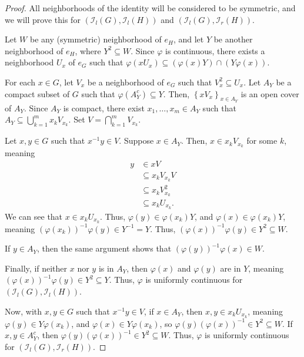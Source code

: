 \documentclass[10pt]{extarticle}
\newcommand{\set}[1]{\left\{#1\right\}}
\theoremstyle{plain}
\theoremstyle{definition}
\theoremstyle{note}
\renewcommand{\newline}{\hfill\break}
\begin{document}
\begin{proof}
  All neighborhoods of the identity will be considered to be symmetric, and we will prove this for $\left(\mathcal{I}_l(G),\mathcal{I}_l(H)\right)$ and $\left(\mathcal{I}_l(G),\mathcal{I}_r(H)\right)$.\newline

  Let $W$ be any (symmetric) neighborhood of $e_H$, and let $Y$ be another neighborhood of $e_H$, where $Y^2\subseteq W$. Since $\varphi$ is continuous, there exists a neighborhood $U_x$ of $e_G$ such that $\varphi\left(xU_x\right) \subseteq \left(\varphi(x)Y\right)\cap \left(Y\varphi(x)\right)$.\newline

  For each $x\in G$, let $V_x$ be a neighborhood of $e_G$ such that $V_x^2 \subseteq U_x$. Let $A_Y$ be a compact subset of $G$ such that $\varphi\left(A_Y^{c}\right)\subseteq Y$. Then, $\set{xV_x}_{x\in A_Y}$ is an open cover of $A_Y$. Since $A_Y$ is compact, there exist $x_1,\dots,x_m\in A_Y$ such that $A_Y\subseteq \bigcup_{k=1}^{m}x_kV_{x_k}$. Set $V = \bigcap_{k=1}^{m}V_{x_k}$.\newline

  Let $x,y\in G$ such that $x^{-1}y\in V$. Suppose $x\in A_Y$. Then, $x\in x_kV_{x_k}$ for some $k$, meaning
  \begin{align*}
    y&\in xV\\
     &\subseteq x_kV_{x_k}V\\
     &\subseteq x_kV_{x_k}^2\\
     &\subseteq x_kU_{x_k}.
  \end{align*}
  We can see that $x\in x_kU_{x_k}$. Thus, $\varphi\left(y\right)\in \varphi\left(x_k\right)Y$, and $\varphi(x) \in \varphi\left(x_k\right)Y$, meaning $\left(\varphi\left(x_k\right)\right)^{-1}\varphi(y)\in Y^{-1} = Y$. Thus, $\left(\varphi(x)\right)^{-1}\varphi(y) \in Y^2\subseteq W$.\newline

  If $y\in A_Y$, then the same argument shows that $\left(\varphi(y)\right)^{-1}\varphi(x)\in W$.\newline

  Finally, if neither $x$ nor $y$ is in $A_Y$, then $\varphi(x)$ and $\varphi(y)$ are in $Y$, meaning $\left(\varphi(x)\right)^{-1}\varphi(y)\in Y^{2}\subseteq Y$. Thus, $\varphi$ is uniformly continuous for $\left(\mathcal{I}_l(G),\mathcal{I}_l(H)\right)$.\newline

  Now, with $x,y\in G$ such that $x^{-1}y\in V$, if $x\in A_Y$, then $x,y\in x_kU_{x_k}$, meaning $\varphi(y)\in Y\varphi\left(x_{k}\right)$, and $\varphi(x)\in Y\varphi\left(x_k\right)$, so $\varphi(y)\left(\varphi\left(x\right)\right)^{-1} \in Y^{2}\subseteq W$. If $x,y\in A_Y^{c}$, then $\varphi(y)\left(\varphi(x)\right)^{-1}\in Y^{2}\subseteq W$. Thus, $\varphi$ is uniformly continuous for $\left(\mathcal{I}_l(G),\mathcal{I}_r(H)\right)$.
\end{proof}
\end{document}
